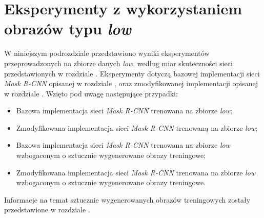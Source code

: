 \section{Eksperymenty z wykorzystaniem obrazów typu \textit{low}}
\label{sec:experymenty_low}
W niniejszym podrozdziale przedstawiono wyniki eksperymentów przeprowadzonych na zbiorze danych \textit{low}, według miar skuteczności sieci przedstawionych w rozdziale .
Eksperymenty dotyczą bazowej implementacji sieci \textit{Mask R-CNN} \cite{matterport-mask-rcnn} opisanej w rozdziale , oraz zmodyfikowanej implementacji opisanej w rozdziale .
 Wzięto pod uwagę następujące przypadki:

\begin{itemize}
 \item Bazowa implementacja sieci \textit{Mask R-CNN} trenowana na zbiorze \textit{low};
 \item Zmodyfikowana implementacja sieci \textit{Mask R-CNN} trenowaną na zbiorze \textit{low};
 \item Bazowa implementacja sieci \textit{Mask R-CNN} trenowana na zbiorze \textit{low} wzbogaconym o sztucznie wygenerowane obrazy treningowe;
 \item Zmodyfikowana implementacja sieci \textit{Mask R-CNN} trenowana na zbiorze \textit{low} wzbogaconym o sztucznie wygenerowane obrazy treningowe.
\end{itemize}

Informacje na temat sztucznie wygenerowanych obrazów treningowych zostały przedstawione w rozdziale .
